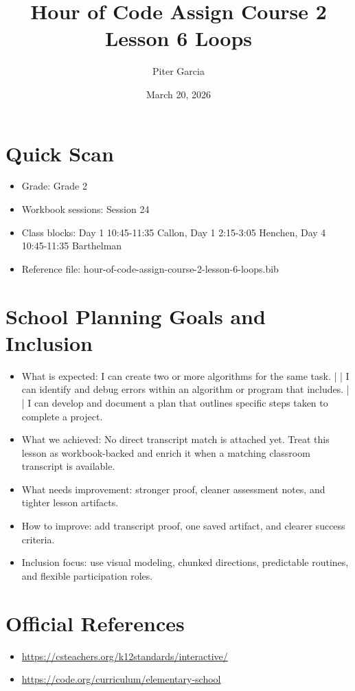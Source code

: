 \documentclass[11pt]{article}
\title{Hour of Code Assign Course 2 Lesson 6 Loops}
\author{Piter Garcia}
\date{March 20, 2026}
\begin{document}
    \maketitle
    \section*{Quick Scan}
    \begin{itemize}[leftmargin=*]
    \item Grade: Grade 2
    \item Workbook sessions: Session 24
    \item Class blocks: Day 1 10:45-11:35 Callon, Day 1 2:15-3:05 Henchen, Day 4 10:45-11:35 Barthelman
    \item Reference file: hour-of-code-assign-course-2-lesson-6-loops.bib
    \end{itemize}
    \section*{School Planning Goals and Inclusion}
    \begin{itemize}[leftmargin=*]
    \item What is expected: I can create two or more algorithms for the same task. | | I can identify and debug errors within an algorithm or program that includes. | | I can develop and document a plan that outlines specific steps taken to complete a project.
    \item What we achieved: No direct transcript match is attached yet. Treat this lesson as workbook-backed and enrich it when a matching classroom transcript is available.
    \item What needs improvement: stronger proof, cleaner assessment notes, and tighter lesson artifacts.
    \item How to improve: add transcript proof, one saved artifact, and clearer success criteria.
    \item Inclusion focus: use visual modeling, chunked directions, predictable routines, and flexible participation roles.
    \end{itemize}
    \section*{Official References}
    \begin{itemize}[leftmargin=*]
    \item \url{https://csteachers.org/k12standards/interactive/}
\item \url{https://code.org/curriculum/elementary-school}

    \end{itemize}
    
\end{document}
